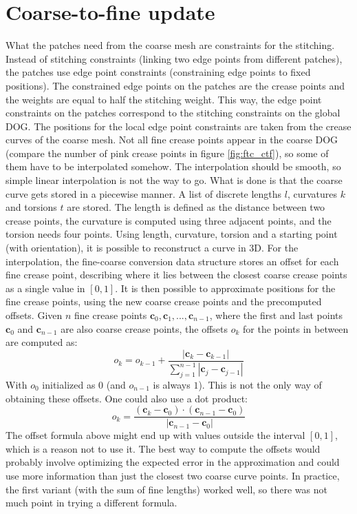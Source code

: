 \documentclass[a4paper,twoside,12pt,nochapterprefix]{scrbook}
\begin{document}
\section{Coarse-to-fine update}\label{sec:ctf_update}
What the patches need from the coarse mesh are constraints for the stitching. Instead of stitching constraints (linking two edge points from different patches), the patches use edge point constraints (constraining edge points to fixed positions). The constrained edge points on the patches are the crease points and the weights are equal to half the stitching weight. This way, the edge point constraints on the patches correspond to the stitching constraints on the global DOG.\newline
The positions for the local edge point constraints are taken from the crease curves of the coarse mesh. Not all fine crease points appear in the coarse DOG (compare the number of pink crease points in figure \ref{fig:ftc_ctf}), so some of them have to be interpolated somehow. The interpolation should be smooth, so simple linear interpolation is not the way to go.\newline
What is done is that the coarse curve gets stored in a piecewise manner. A list of discrete lengths $l$, curvatures $k$ and torsions $t$ are stored. The length is defined as the distance between two crease points, the curvature is computed using three adjacent points, and the torsion needs four points. Using length, curvature, torsion and a starting point (with orientation), it is possible to reconstruct a curve in 3D. For the interpolation, the fine-coarse conversion data structure stores an offset for each fine crease point, describing where it lies between the closest coarse crease points as a single value in $[0,1]$. It is then possible to approximate positions for the fine crease points, using the new coarse crease points and the precomputed offsets.
Given $n$ fine crease points $\mathbf{c}_0, \mathbf{c}_1, ..., \mathbf{c}_{n-1}$, where the first and last points $\mathbf{c}_0$ and $\mathbf{c}_{n-1}$ are also coarse crease points, the offsets $o_k$ for the points in between are computed as:
\begin{equation}
o_k = o_{k-1} + \frac{|\mathbf{c}_k-\mathbf{c}_{k-1}|}{\sum_{j=1}^{n-1}{|\mathbf{c}_j-\mathbf{c}_{j-1}|}}
\end{equation}
With $o_0$ initialized as $0$ (and $o_{n-1}$ is always $1$). This is not the only way of obtaining these offsets. One could also use a dot product:
\begin{equation}
o_k = \frac{(\mathbf{c}_k-\mathbf{c}_0) \cdot (\mathbf{c}_{n-1}-\mathbf{c}_0)}{|\mathbf{c}_{n-1}-\mathbf{c}_0|}
\end{equation}
The offset formula above might end up with values outside the interval $[0,1]$, which is a reason not to use it. The best way to compute the offsets would probably involve optimizing the expected error in the approximation and could use more information than just the closest two coarse curve points. In practice, the first variant (with the sum of fine lengths) worked well, so there was not much point in trying a different formula.\newline
\end{document}
